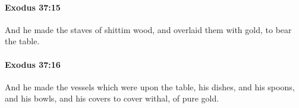 		\paragraph{Exodus 37:15} %
			\label{EXODUS-37-15}

			And he made the staves of shittim wood, and overlaid them with gold, to bear the table.


		\paragraph{Exodus 37:16} %
			\label{EXODUS-37-16}

			And he made the vessels which were upon the table, his dishes, and his spoons, and his bowls, and his covers to cover withal, of pure gold.


